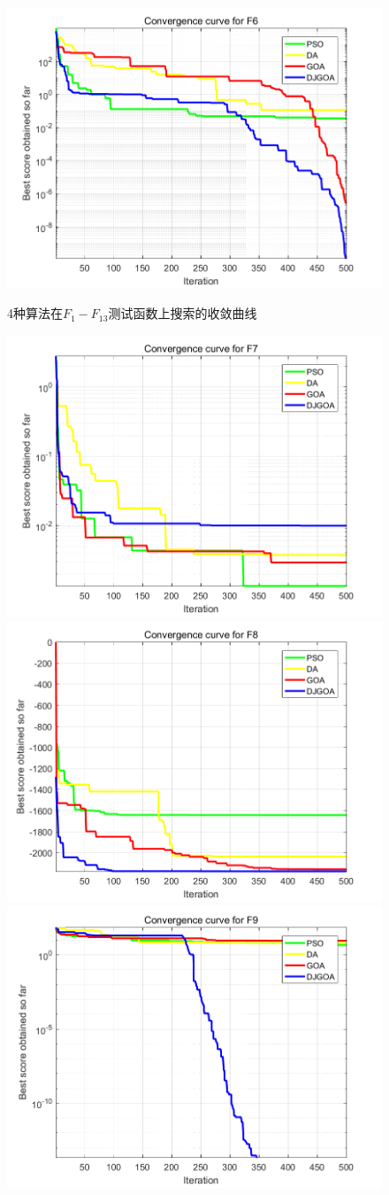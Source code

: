 \begin{figure}[!htbp]
    \includegraphics[width=.5\linewidth]{DJGOA_F6}\hfill\\[0.5cm]
    \caption{4种算法在$F_{1}-F_{13}$测试函数上搜索的收敛曲线}
    \label{fig:DJGOA_convergence_curve}
\end{figure}

\begin{figure}[!htbp]
    \ContinuedFloat
    \centering
    \includegraphics[width=.5\linewidth]{DJGOA_F7}\hfill
    \includegraphics[width=.5\linewidth]{DJGOA_F8}\hfill\\[0.5cm]
    \centering
    \includegraphics[width=.5\linewidth]{DJGOA_F9}\hfill

\end{figure}

